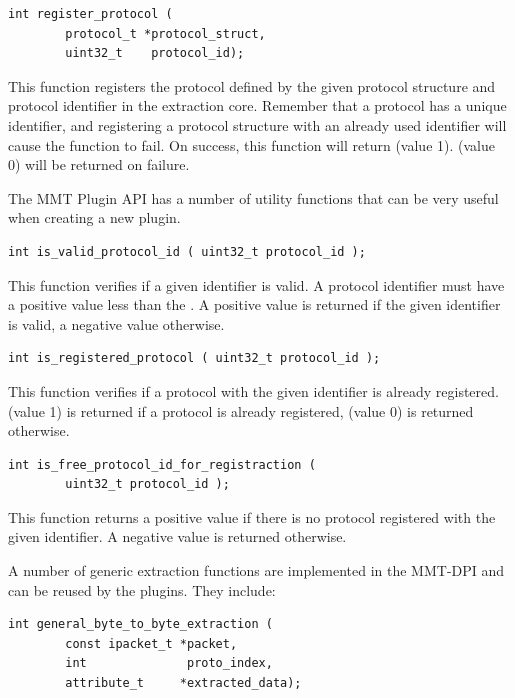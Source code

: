 \begin{lstlisting}[style=Cpp]
int register_protocol (
        protocol_t *protocol_struct, 
        uint32_t    protocol_id);
\end{lstlisting}

This function registers the protocol defined by the given protocol structure and protocol identifier in the extraction core. Remember that a protocol has a unique identifier, and registering a protocol structure with an already used identifier will cause the function to fail. On success, this function will return  (value 1).  (value 0) will be 
returned on failure.

The MMT Plugin API has a number of utility functions that can be very useful when creating a new plugin. 

\begin{lstlisting}[style=Cpp]
int is_valid_protocol_id ( uint32_t protocol_id );
\end{lstlisting}

This function verifies if a given identifier is valid. A protocol identifier must have a positive value less than the . A positive value is returned if the given identifier is valid, a negative value otherwise.

\begin{lstlisting}[style=Cpp]
int is_registered_protocol ( uint32_t protocol_id );
\end{lstlisting}

This function verifies if a protocol with the given identifier is already registered.  (value 1) is returned if a protocol is already registered,  (value 0) is returned otherwise.

\begin{lstlisting}[style=Cpp]
int is_free_protocol_id_for_registraction ( 
        uint32_t protocol_id );
\end{lstlisting}

This function returns a positive value if there is no protocol registered with the given identifier. A negative value is returned otherwise.

A number of generic extraction functions are implemented in the MMT-DPI and can be reused by the plugins. They include:

\begin{lstlisting}[style=Cpp]
int general_byte_to_byte_extraction (
        const ipacket_t *packet, 
        int              proto_index, 
        attribute_t     *extracted_data);
\end{lstlisting}

